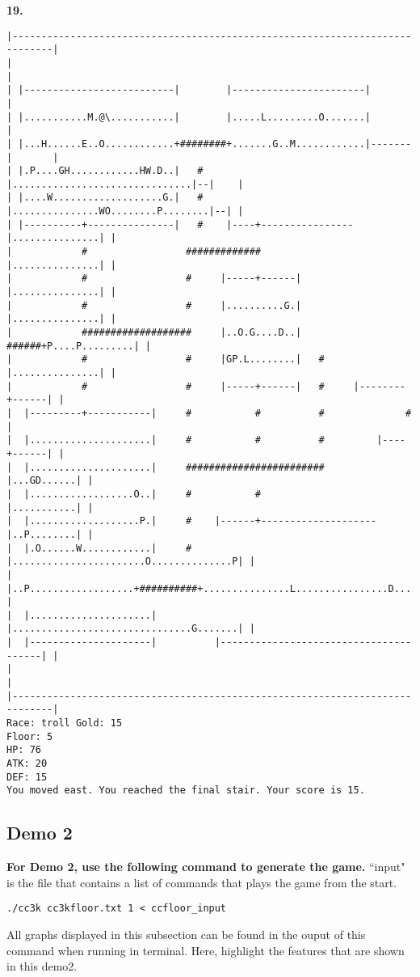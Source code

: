 \documentclass[11pt]{article}
\theoremstyle{plain}
\begin{document}
\newpage
\textbf{19. }
\begin{Verbatim}[fontsize=\scriptsize]
|-----------------------------------------------------------------------------|
|                                                                             |
| |--------------------------|        |-----------------------|               |
| |...........M.@\...........|        |.....L.........O.......|               |
| |...H......E..O............+########+.......G..M............|-------|       |
| |.P....GH............HW.D..|   #    |...............................|--|    |
| |....W...................G.|   #    |...............WO........P........|--| |
| |----------+---------------|   #    |----+----------------|...............| |
|            #                 #############                |...............| |
|            #                 #     |-----+------|         |...............| |
|            #                 #     |..........G.|         |...............| |
|            ###################     |..O.G....D..|   ######+P....P.........| |
|            #                 #     |GP.L........|   #     |...............| |
|            #                 #     |-----+------|   #     |--------+------| |
|  |---------+-----------|     #           #          #              #        |
|  |.....................|     #           #          #         |----+------| |
|  |.....................|     ########################         |...GD......| |
|  |..................O..|     #           #                    |...........| |
|  |...................P.|     #    |------+--------------------|..P........| |
|  |.O......W............|     #    |.......................O..............P| |
|  |..P..................+##########+...............L................D......| |
|  |.....................|          |...............................G.......| |
|  |---------------------|          |---------------------------------------| |
|                                                                             |
|-----------------------------------------------------------------------------|
Race: troll Gold: 15                                                   Floor: 5
HP: 76
ATK: 20
DEF: 15
You moved east. You reached the final stair. Your score is 15. 
\end{Verbatim}






\newpage

\subsection{Demo 2}
\textbf{For Demo 2, use the following command to generate the game.} ``input"
is the file that contains a list of commands that plays the game from the
start.
\begin{lstlisting}
./cc3k cc3kfloor.txt 1 < ccfloor_input
\end{lstlisting}
All graphs displayed in this subsection can be found in the ouput of
this command when running in terminal. Here, highlight the features that
are shown in this demo2.
\end{document}
